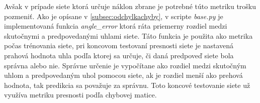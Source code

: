 Avšak v prípade siete ktorá určuje náklon zbrane je potrebné túto metriku trošku pozmeniť.
Ako je opísane v \ref{subsec:odchylkachyby}, v scripte \textit{base.py} je implementovaná funkcia \textit{angle\_error} ktorá ráta priemerny rozdiel medzi
    skutočnymi a predpovedanými uhlami siete.
Táto funkcia je použita ako metrika počas trénovania siete, pri koncovom testovaní presnosti siete je nastavená prahová hodnota uhla podľa ktorej sa určuje,
    či daná predpoveď siete bola správna alebo nie.
Správne určenie je vypočítane ako rozdiel medzi skutočným uhlom a predpovedaným uhol pomocou siete, ak je rozdiel menší ako prehová hodnota, tak predikcia
    sa považuje za správnu.
Toto koncové testovanie siete už využíva metriku presnosti podľa chybovej matice.
